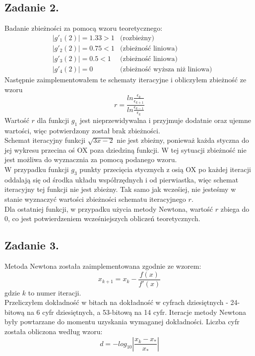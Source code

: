\documentclass[11pt, leqno]{scrartcl}
\begin{document}
    \subsection{Zadanie 2.}
    Badanie zbieżności za pomocą wzoru teoretycznego:
    \begin{align*}
        &|g'_1(2)|=1.33>1 &\text{(rozbieżny)} \\
        &|g'_2(2)|=0.75<1 &\text{(zbieżność liniowa)} \\
        &|g'_3(2)|=0.5<1 &\text{(zbieżność liniowa)} \\
        &|g'_4(2)|=0 &\text{(zbieżność wyższa niż liniowa)}
    \end{align*}
    Następnie zaimplementowałem te schematy iteracyjne
    i obliczyłem zbieżność ze wzoru
    \[
        r=\frac{ln\frac{\epsilon_k}{\epsilon_{k+1}}}
            {ln\frac{\epsilon_{k-1}}{\epsilon_k}}
    \]
    Wartość $r$ dla funkcji $g_1$ jest nieprzewidywalna
    i przyjmuje dodatnie oraz ujemne wartości, więc
    potwierdzony został brak zbieżności. \\
    Schemat iteracyjny funkcji $\sqrt{3x-2}$ nie jest
    zbieżny, ponieważ każda styczna do jej wykresu
    przecina oś OX poza dziedziną funkcji. W tej sytuacji
    zbieżność nie jest możliwa do wyznacznia za pomocą podanego
    wzoru. \\
    W przypadku funkcji $g_3$ punkty przecięcia
    stycznych z osią OX po każdej iteracji oddalają
    się od środka układu współrzędnych i od pierwiastka,
    więc schemat iteracyjny tej funkcji nie jest
    zbieżny. Tak samo jak wcześiej, nie jesteśmy w stanie wyznaczyć
    wartości zbieżności schematu iteracyjnego $r$. \\
    Dla ostatniej funkcji, w przypadku użycia metody
    Newtona, wartość $r$ zbiega do 0, co jest
    potwierdzeniem wcześniejszych obliczeń teoretycznych.
    
    \subsection{Zadanie 3.}
    Metoda Newtona została zaimplementowana zgodnie ze
    wzorem:
    \[
        x_{k+1}=x_k-\frac{f(x)}{f'(x)}
    \]
    gdzie $k$ to numer iteracji. \\
    Przeliczyłem dokładność w bitach na dokładność w cyfrach
    dziesiętnych - 24-bitową na 6 cyfr dziesiętnych,
    a 53-bitową na 14 cyfr. Iteracje metody Newtona były
    powtarzane do momentu uzyskania wymaganej dokładności.
    Liczba cyfr została obliczona według wzoru:
    \[
        d=-log_{10}\left| \frac{x_k-x_*}{x_*} \right|
    \]
\end{document}
